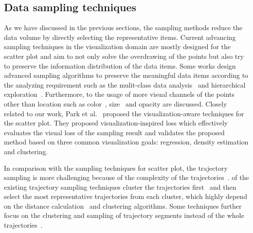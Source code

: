 \subsection{Data sampling techniques}
As we have discussed in the previous sections, the sampling methods reduce the data volume by directly selecting the representative items. Current advancing sampling techniques in the visualization domain are mostly designed for the scatter plot and aim to not only solve the overdrawing of the points but also try to preserve the information distribution of the data items. 
Some works design advanced sampling algorithms to preserve the meaningful data items according to the analyzing requirement such as the mulit-class data analysis~\cite{chen2014visual} and hierarchical exploration~\cite{}. Furthermore, to the usage of more visual channels of the points other than location such as color~\cite{chen2014visual}, size~\cite{woodruff1998constant} and opacity are discussed. 
Closely related to our work, Park et al.~\cite{park2016visualization} proposed the visualization-aware techniques for the scatter plot. They proposed visualization-inspired loss which effectively evaluates the visual loss of the sampling result and validates the proposed method based on three common visualization goals:  regression, density estimation and clustering. 

In comparison with the sampling techniques for scatter plot, the trajectory sampling is more challenging because of the complexity of the trajectories~\cite{pelekis2010unsupervised}.  of the existing trajectory sampling techniques cluster the trajectories first~\cite{pelekis2009clustering} and then select the most representative trajectories from each cluster, which highly depend on the distance calculation~\cite{pelekis2007similarity} and clustering algorithms. Some techniques further focus on the clustering and sampling of trajectory segments instead of the whole trajectories~\cite{panagiotakis2011segmentation}. 
